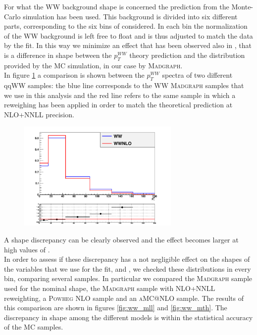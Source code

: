 For what the WW background shape is concerned the prediction from the Monte-Carlo simulation has been used.
This background is divided into six different parts, corresponding to the six bins of \pth considered. In each bin the normalization of the WW background is left free to float and is thus adjusted to match the data by the fit. In this way we minimize an effect that has been observed also in \cite{CMS_AN_2014_056}, that is a difference in shape between the $p_T^{WW}$ theory prediction and the distribution provided by the MC simulation, in our case by \textsc{Madgraph}.\\
In figure \ref{fig:ww_wwnlo} a comparison is shown between the $p_T^{WW}$ spectra of two different qqWW samples: the blue line corresponds to the WW \textsc{Madgraph} samples that we use in this analysis and the red line refers to the same sample in which a reweighing has been applied in order to match the theoretical prediction at NLO+NNLL precision. 
\begin{figure}[b]
\centering
\includegraphics[width=0.7\textwidth]{images/WWnlo/WW_WWnlo.pdf}
\caption{}\label{fig:ww_wwnlo}
\end{figure}
A shape discrepancy can be clearly observed and the effect becomes larger at high values of \pth.\\
In order to assess if these discrepancy has a not negligible effect on the shapes of the variables that we use for the fit, \mll and \mt, we checked these distributions in every \pth bin, comparing several samples. In particular we compared the \textsc{Madgraph} sample used for the nominal shape, the \textsc{Madgraph} sample with NLO+NNLL  reweighting, a \textsc{Powheg} NLO sample and an \textsc{aMC@NLO} sample.
The results of this comparison are shown in figures \ref{fig:ww_mll} and \ref{fig:ww_mth}. The discrepancy in shape among the different models is within the statistical accuracy of the MC samples. 

